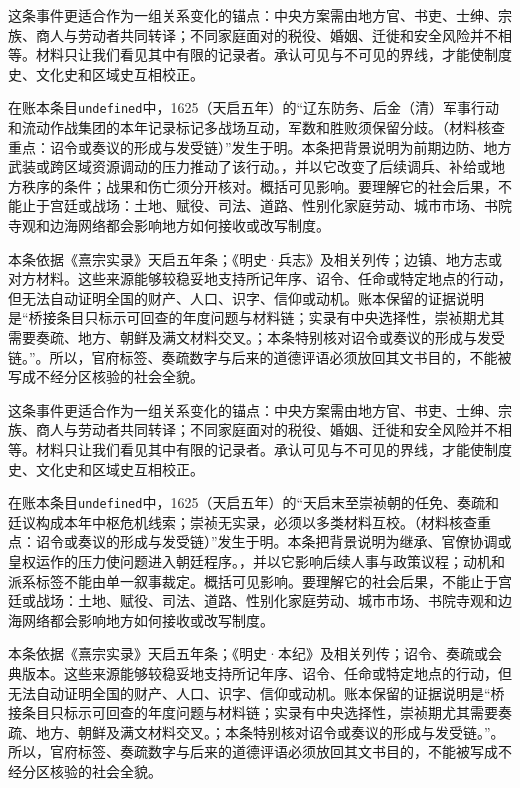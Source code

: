 这条事件更适合作为一组关系变化的锚点：中央方案需由地方官、书吏、士绅、宗族、商人与劳动者共同转译；不同家庭面对的税役、婚姻、迁徙和安全风险并不相等。材料只让我们看见其中有限的记录者。承认可见与不可见的界线，才能使制度史、文化史和区域史互相校正。

在账本条目\texttt{undefined}中，1625（天启五年）的“辽东防务、后金（清）军事行动和流动作战集团的本年记录标记多战场互动，军数和胜败须保留分歧。（材料核查重点：诏令或奏议的形成与发受链）”发生于明。本条把背景说明为前期边防、地方武装或跨区域资源调动的压力推动了该行动。，并以它改变了后续调兵、补给或地方秩序的条件；战果和伤亡须分开核对。概括可见影响。要理解它的社会后果，不能止于宫廷或战场：土地、赋役、司法、道路、性别化家庭劳动、城市市场、书院寺观和边海网络都会影响地方如何接收或改写制度。

本条依据《熹宗实录》天启五年条；《明史·兵志》及相关列传；边镇、地方志或对方材料。这些来源能够较稳妥地支持所记年序、诏令、任命或特定地点的行动，但无法自动证明全国的财产、人口、识字、信仰或动机。账本保留的证据说明是“桥接条目只标示可回查的年度问题与材料链；实录有中央选择性，崇祯期尤其需要奏疏、地方、朝鲜及满文材料交叉。；本条特别核对诏令或奏议的形成与发受链。”。所以，官府标签、奏疏数字与后来的道德评语必须放回其文书目的，不能被写成不经分区核验的社会全貌。

这条事件更适合作为一组关系变化的锚点：中央方案需由地方官、书吏、士绅、宗族、商人与劳动者共同转译；不同家庭面对的税役、婚姻、迁徙和安全风险并不相等。材料只让我们看见其中有限的记录者。承认可见与不可见的界线，才能使制度史、文化史和区域史互相校正。

在账本条目\texttt{undefined}中，1625（天启五年）的“天启末至崇祯朝的任免、奏疏和廷议构成本年中枢危机线索；崇祯无实录，必须以多类材料互校。（材料核查重点：诏令或奏议的形成与发受链）”发生于明。本条把背景说明为继承、官僚协调或皇权运作的压力使问题进入朝廷程序。，并以它影响后续人事与政策议程；动机和派系标签不能由单一叙事裁定。概括可见影响。要理解它的社会后果，不能止于宫廷或战场：土地、赋役、司法、道路、性别化家庭劳动、城市市场、书院寺观和边海网络都会影响地方如何接收或改写制度。

本条依据《熹宗实录》天启五年条；《明史·本纪》及相关列传；诏令、奏疏或会典版本。这些来源能够较稳妥地支持所记年序、诏令、任命或特定地点的行动，但无法自动证明全国的财产、人口、识字、信仰或动机。账本保留的证据说明是“桥接条目只标示可回查的年度问题与材料链；实录有中央选择性，崇祯期尤其需要奏疏、地方、朝鲜及满文材料交叉。；本条特别核对诏令或奏议的形成与发受链。”。所以，官府标签、奏疏数字与后来的道德评语必须放回其文书目的，不能被写成不经分区核验的社会全貌。

